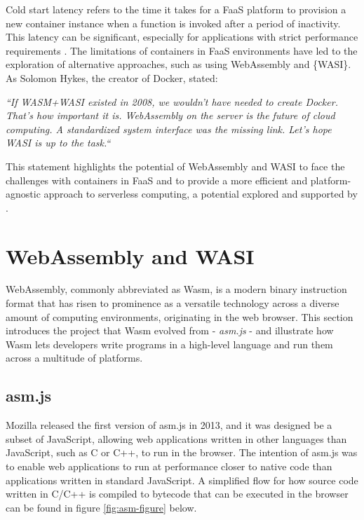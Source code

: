 \documentclass[
  table]{report}
\begin{document}
Cold start latency refers to the time it takes for a FaaS platform to
provision a new container instance when a function is invoked after a
period of inactivity. This latency can be significant, especially for
applications with strict performance requirements
\citep{wangPeekingCurtainsServerless2018}. The limitations of containers
in FaaS environments have led to the exploration of alternative
approaches, such as using WebAssembly and \{WASI\}. As Solomon Hykes,
the creator of Docker, stated:

\begin{displayquote}
\textit{ ``If WASM+WASI existed in 2008, we wouldn't have needed to create Docker.
That's how important it is. WebAssembly on the server is the future of cloud
computing. A standardized system interface was the missing link. Let's hope WASI
is up to the task.`` \citep{hykesOne2019} }
\end{displayquote}

This statement highlights the potential of WebAssembly and \ac{WASI} to
face the challenges with containers in FaaS and to provide a more
efficient and platform-agnostic approach to serverless computing, a
potential explored and supported by
\citet{kjorveziroskiEvaluatingWebAssemblyOrchestrated2022}.

\section{WebAssembly and WASI}
\label{sect:wasmwasi}

WebAssembly, commonly abbreviated as Wasm, is a modern binary
instruction format that has risen to prominence as a versatile
technology across a diverse amount of computing environments,
originating in the web browser. This section introduces the project that
\ac{Wasm} evolved from - \emph{asm.js} - and illustrate how \ac{Wasm}
lets developers write programs in a high-level language and run them
across a multitude of platforms.

\subsection{asm.js}
\label{subsect:asm}

Mozilla released the first version of asm.js in 2013, and it was
designed be a subset of JavaScript, allowing web applications written in
other languages than JavaScript, such as C or C++, to run in the
browser. The intention of asm.js was to enable web applications to run
at performance closer to native code than applications written in
standard JavaScript. A simplified flow for how source code written in
C/C++ is compiled to bytecode that can be executed in the browser can be
found in figure \ref{fig:asm-figure} below.
\end{document}
